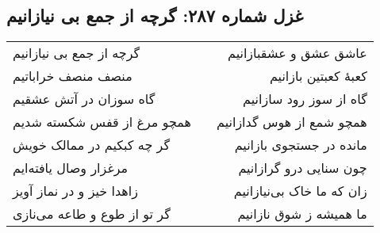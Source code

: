 \begin{center}
\section*{غزل شماره ۲۸۷: گرچه از جمع بی نیازانیم}
\label{sec:287}
\begin{longtable}{l p{0.5cm} r}
گرچه از جمع بی نیازانیم
&&
عاشق عشق و عشقبازانیم
\\
منصف منصف خراباتیم
&&
کعبهٔ کعبتین بازانیم
\\
گاه سوزان در آتش عشقیم
&&
گاه از سوز رود سازانیم
\\
همچو مرغ از قفس شکسته شدیم
&&
همچو شمع از هوس گدازانیم
\\
گر چه کبکیم در ممالک خویش
&&
مانده در جستجوی بازانیم
\\
مرغزار وصال یافته‌ایم
&&
چون سنایی درو گرازانیم
\\
زاهدا خیز و در نماز آویز
&&
زان که ما خاک بی‌نیازانیم
\\
گر تو از طوع و طاعه می‌نازی
&&
ما همیشه ز شوق نازانیم
\\
\end{longtable}
\end{center}
